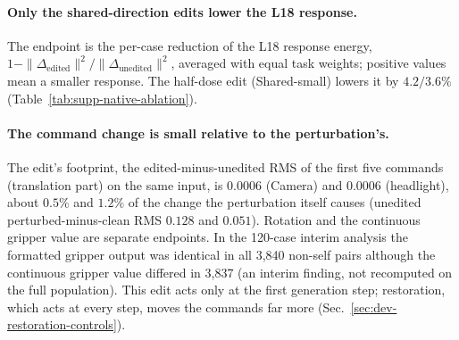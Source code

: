 \paragraph{Only the shared-direction edits lower the L18 response.}
The endpoint is the per-case reduction of the L18 response energy, $1-\|\Delta_{\mathrm{edited}}\|^2/\|\Delta_{\mathrm{unedited}}\|^2$, averaged with equal task weights; positive values mean a smaller response. The half-dose edit (Shared-small) lowers it by $4.2/3.6\%$ (Table~\ref{tab:supp-native-ablation}).

\paragraph{The command change is small relative to the perturbation's.}
The edit's footprint, the edited-minus-unedited RMS of the first five commands (translation part) on the same input, is $0.0006$ (Camera) and $0.0006$ (headlight), about $0.5\%$ and $1.2\%$ of the change the perturbation itself causes (unedited perturbed-minus-clean RMS $0.128$ and $0.051$). Rotation and the continuous gripper value are separate endpoints. In the 120-case interim analysis the formatted gripper output was identical in all 3{,}840 non-self pairs although the continuous gripper value differed in 3{,}837 (an interim finding, not recomputed on the full population). This edit acts only at the first generation step; restoration, which acts at every step, moves the commands far more (Sec.~\ref{sec:dev-restoration-controls}).

